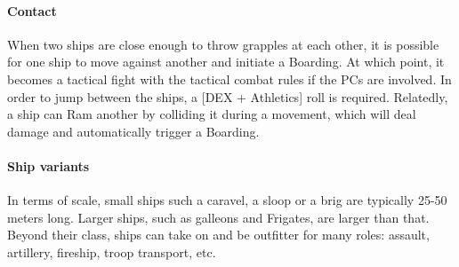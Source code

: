 \paragraph{Contact}

When two ships are close enough to throw grapples at each other, it is possible for one ship to move against another and initiate a Boarding. At which point, it becomes a tactical fight with the tactical combat rules if the PCs are involved. In order to jump between the ships, a [DEX + Athletics] roll is required. Relatedly, a ship can Ram another by colliding it during a movement, which will deal damage and automatically trigger a Boarding. 

\paragraph{Ship variants}

In terms of scale, small ships such a caravel, a sloop or a brig are typically 25-50 meters long. Larger ships, such as galleons and Frigates, are larger than that. Beyond their class, ships can take on and be outfitter for many roles: assault, artillery, fireship, troop transport, etc.








